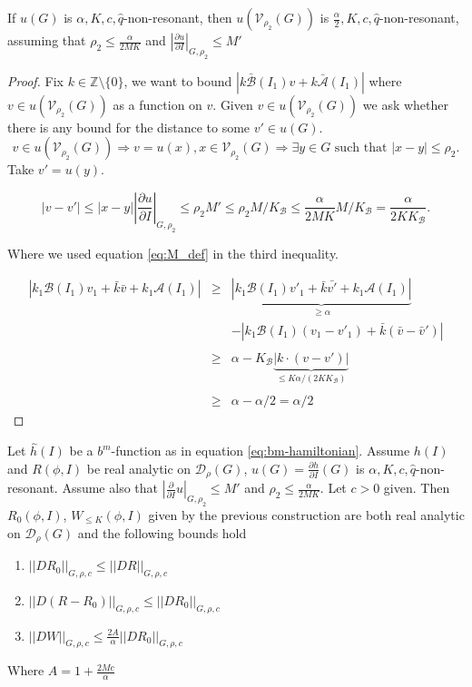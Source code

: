 \begin{lemma}
If $u(G)$ is $\alpha,K, c,\hat{q}$-non-resonant, then $u(\mathcal{V}_{\rho_2}(G))$ is $\frac{\alpha}{2},K, c,\hat{q}$-non-resonant, assuming that $\rho_2\leq \frac{\alpha}{2MK}$ and $\left|\frac{\partial u}{\partial I}\right|_{G,\rho_2} \leq M'$
\end{lemma}
\begin{proof}
Fix $k\in\mathbb{Z}\setminus\{0\}$, we want to bound $|k \bar{\mathcal{B}}(I_1) v + k \bar{\mathcal{A}}(I_1)|$ where $v\in u(\mathcal{V}_{\rho_2}(G))$ as a function on $v$.
Given $v \in u(\mathcal{V}_{\rho_2}(G))$ we  ask whether there is any bound for the distance to some $v'\in u(G)$.
$$v \in u(\mathcal{V}_{\rho_2}(G)) \Rightarrow v = u(x), x \in \mathcal{V}_{\rho_2}(G)\Rightarrow\exists y \in G \text{ such that } |x-y| \leq \rho_2.$$
Take $v'=u(y)$.


$$|v-v'|\leq|x-y|\left|\frac{\partial u}{\partial I}\right|_{G,\rho_2} \leq \rho_2 M' \leq \rho_2  M/K_\mathcal{B} \leq \frac{\alpha}{2MK} M/K_\mathcal{B} = \frac{\alpha}{2K K_\mathcal{B}}.$$

Where we used equation \ref{eq:M_def} in the third inequality.

$$
\begin{array}{rcl}
\displaystyle |k_1 \mathcal{B}(I_1) v_1 + \bar{k}\bar{v} + k_1 \mathcal{A}(I_1)| & \geq & \displaystyle \underbrace{|k_1 \mathcal{B}(I_1) v'_1 + \bar{k}\bar{v'} + k_1 \mathcal{A}(I_1)|}_{\geq \alpha} \\
& & -|k_1 \mathcal{B}(I_1) (v_1-v'_1) + \bar{k}(\bar{v} - \bar{v}')|\\
\\
& \geq & \displaystyle \alpha - K_\mathcal{B}\underbrace{|k\cdot(v-v')|}_{\leq K \alpha /(2K K_\mathcal{B})} \\
\\
 & \geq & \alpha -\alpha/2 = \alpha/2
\end{array}
$$

\end{proof}

\begin{proposition}\label{prop:14}
Let $\hat{h}(I)$ be a $b^m$-function as in equation \ref{eq:bm-hamiltonian}. Assume $h(I)$ and $R(\phi, I)$ be real analytic on $\mathcal{D}_\rho(G)$, $u(G) = \frac{\partial h}{\partial I}(G)$ is $\alpha, K, c, \hat{q}$-non-resonant.
Assume also that
$|\frac{\partial}{\partial I} u|_{G,\rho_2} \leq M'$
and $\rho_2 \leq \frac{\alpha}{2MK}$. Let $c > 0$ given.
Then $R_0(\phi, I)$, $W_{\leq K}(\phi, I)$ given by the previous construction are both real analytic on $\mathcal{D}_\rho(G)$ and the following bounds hold
\begin{enumerate}
\item\label{prop:14:item:1} $||D R_0||_{G,\rho,c} \leq ||D R||_{G,\rho,c}$
\item\label{prop:14:item:2} $||D (R - R_0)||_{G,\rho,c} \leq ||D R_0||_{G,\rho,c}$
\item\label{prop:14:item:3} $||D W||_{G,\rho,c} \leq \frac{2A}{\alpha}||D R_0||_{G,\rho,c}$
\end{enumerate}
Where $A = 1 + \frac{2Mc}{\alpha}$
\end{proposition}

